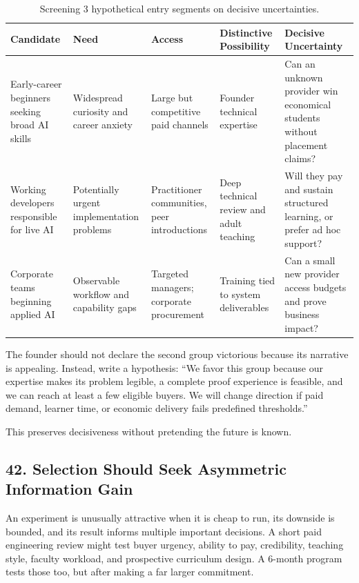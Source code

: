 \begin{table}[t]
\centering
\small
\begin{tabularx}{\textwidth}{>{\raggedright\arraybackslash}p{3.2cm} >{\raggedright\arraybackslash}p{3.0cm} >{\raggedright\arraybackslash}p{2.8cm} >{\raggedright\arraybackslash}p{3.2cm} >{\raggedright\arraybackslash}X}
\toprule
\textbf{Candidate} & \textbf{Need} & \textbf{Access} & \textbf{Distinctive Possibility} & \textbf{Decisive Uncertainty} \\
\midrule
Early-career beginners seeking broad AI skills & Widespread curiosity and career anxiety & Large but competitive paid channels & Founder technical expertise & Can an unknown provider win economical students without placement claims? \\
Working developers responsible for live AI & Potentially urgent implementation problems & Practitioner communities, peer introductions & Deep technical review and adult teaching & Will they pay and sustain structured learning, or prefer ad hoc support? \\
Corporate teams beginning applied AI & Observable workflow and capability gaps & Targeted managers; corporate procurement & Training tied to system deliverables & Can a small new provider access budgets and prove business impact? \\
\bottomrule
\end{tabularx}
\caption{Screening 3 hypothetical entry segments on decisive uncertainties.}
\label{tab:ch7-three-candidates}
\end{table}

The founder should not declare the second group victorious because its narrative is appealing. Instead, write a hypothesis: ``We favor this group because our expertise makes its problem legible, a complete proof experience is feasible, and we can reach at least a few eligible buyers. We will change direction if paid demand, learner time, or economic delivery fails predefined thresholds.''

This preserves decisiveness without pretending the future is known.

\subsection*{42. Selection Should Seek Asymmetric Information Gain}

An experiment is unusually attractive when it is cheap to run, its downside is bounded, and its result informs multiple important decisions. A short paid engineering review might test buyer urgency, ability to pay, credibility, teaching style, faculty workload, and prospective curriculum design. A 6-month program tests those too, but after making a far larger commitment.

